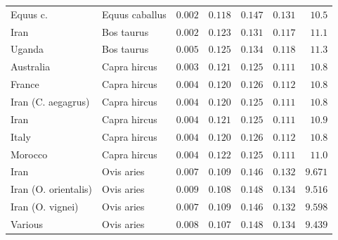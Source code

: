 \documentclass[12pt]{article}
\begin{document}
\begin{center}
\begin{longtable*}{|l|l|r|r|r|r|r|}
            \bottomrule
            \endlastfoot
             Equus c. &      Equus caballus &               $ 0.002$ &                    $ 0.118$ &  $ 0.147$ &           $ 0.131$ &     $  10.5$ \\
            Iran &          Bos taurus &               $ 0.002$ &                    $ 0.123$ &  $ 0.131$ &           $ 0.117$ &     $  11.1$ \\
            Uganda &          Bos taurus &               $ 0.005$ &                    $ 0.125$ &  $ 0.134$ &           $ 0.118$ &     $  11.3$ \\
             Australia &        Capra hircus &               $ 0.003$ &                    $ 0.121$ &  $ 0.125$ &           $ 0.111$ &     $  10.8$ \\
             France &        Capra hircus &               $ 0.004$ &                    $ 0.120$ &  $ 0.126$ &           $ 0.112$ &     $  10.8$ \\
             Iran (C. aegagrus) &        Capra hircus &               $ 0.004$ &                    $ 0.120$ &  $ 0.125$ &           $ 0.111$ &     $  10.8$ \\
             Iran &        Capra hircus &               $ 0.004$ &                    $ 0.121$ &  $ 0.125$ &           $ 0.111$ &     $  10.9$ \\
             Italy &        Capra hircus &               $ 0.004$ &                    $ 0.120$ &  $ 0.126$ &           $ 0.112$ &     $  10.8$ \\
             Morocco &        Capra hircus &               $ 0.004$ &                    $ 0.122$ &  $ 0.125$ &           $ 0.111$ &     $  11.0$ \\
            Iran &          Ovis aries &               $ 0.007$ &                    $ 0.109$ &  $ 0.146$ &           $ 0.132$ &     $ 9.671$ \\
            Iran (O. orientalis) &          Ovis aries &               $ 0.009$ &                    $ 0.108$ &  $ 0.148$ &           $ 0.134$ &     $ 9.516$ \\
            Iran (O. vignei) &          Ovis aries &               $ 0.007$ &                    $ 0.109$ &  $ 0.146$ &           $ 0.132$ &     $ 9.598$ \\
            Various &          Ovis aries &               $ 0.008$ &                    $ 0.107$ &  $ 0.148$ &           $ 0.134$ &     $ 9.439$ \\

\end{longtable*}
\end{center}
\end{document}
